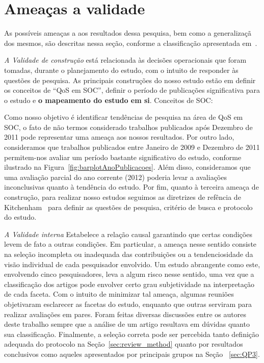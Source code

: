 \section{Amea\c cas a validade}

As poss\'{i}veis amea\c{c}as a aos resultados dessa pesquisa, bem como a generaliza\c c\~{a} dos mesmos, s\~{a}o descritas nessa se\c c\~{a}o, conforme a classifica\c c\~{a}o apresentada em~\cite{leedy1980practical}. 

\noindent
\emph{A Validade de constru\c c\~{a}o} est\'{a} relacionada
\`{a}s decis\~{o}es operacionais que foram tomadas, durante o
planejamento do estudo, com o intuito de responder \`{a}s quest\~{o}es de
pesquisa. As principais constru\c{c}\~{o}es do nosso estudo est\~{a}o em definir os conceitos de ``QoS em SOC'', definir o per\'{i}odo de publica\c{c}\~{o}es significativa para o estudo e \textbf{o mapeamento do estudo em si}. Conceitos de SOC:


Como nosso objetivo \'{e} identificar tend\^{e}ncias de pesquisa na \'{a}rea de QoS em SOC, o fato de n\~{a}o termos considerado trabalhos publicados ap\'{o}s Dezembro de 2011 pode representar uma amea\c ca aos nossos resultados. Por outro lado, consideramos que trabalhos publicados entre Janeiro de 2009 e Dezembro de 2011 permitem-nos avaliar um per\'{i}odo bastante significativo do estudo, conforme ilustrado na Figura~\ref{fig:barplotAnoPublicacoes}. Al\'{e}m disso, consideramos que uma avalia\c c\~{a}o parcial do ano corrente (2012) poderia levar a avalia\c{c}\~{o}es inconclusivas quanto \`{a} tend\^{e}ncia do estudo. Por fim, quanto \`{a} terceira amea\c{c}a de constru\c{c}\~{a}o, para realizar nosso estudos seguimos as diretrizes de ref\^{e}ncia de Kitchenham~\cite{kitchenham:techReport2007} para definir as quest\~{o}es de pesquisa, crit\'{e}rio de busca e protocolo do estudo.

\noindent
\emph{A Validade interna}
Estabelece a rela\c{c}\~{a}o causal garantindo que certas condi\c{c}\~{o}es levem de fato a outras condi\c{c}\~{o}es. Em particular, a ameaça nesse sentido consiste na seleção incompleta ou inadequada das contribuições ou a tendenciosidade da visão individual de cada pesquisador envolvido. Um estudo abrangente como este, envolvendo cinco pesquisadores, leva a algum risco nesse sentido, uma vez que a classifica\c c\~{a}o dos artigos pode envolver certo grau subjetividade na interpreta\c{c}\~{a}o de cada faceta. Com o intuito de minimizar tal amea\c{c}a, algumas reuni\~{o}es objetivaram esclarecer as facetas do estudo, enquanto que outras serviram para realizar avalia\c c\~{o}es em pares. Foram feitas diversas discuss\~{o}es entre os autores deste trabalho sempre que a an\'{a}lise de um artigo resultava em d\'{u}vidas quanto sua classifica\c c\~{a}o. Finalmente, a seleção correta pode ser percebida tanto definição adequada do protocolo na Seção~\ref{sec:review_method} quanto por resultados conclusivos como aqueles apresentados por principais grupos na Se\c{c}\~{a}o ~\ref{sec:QP3}.

